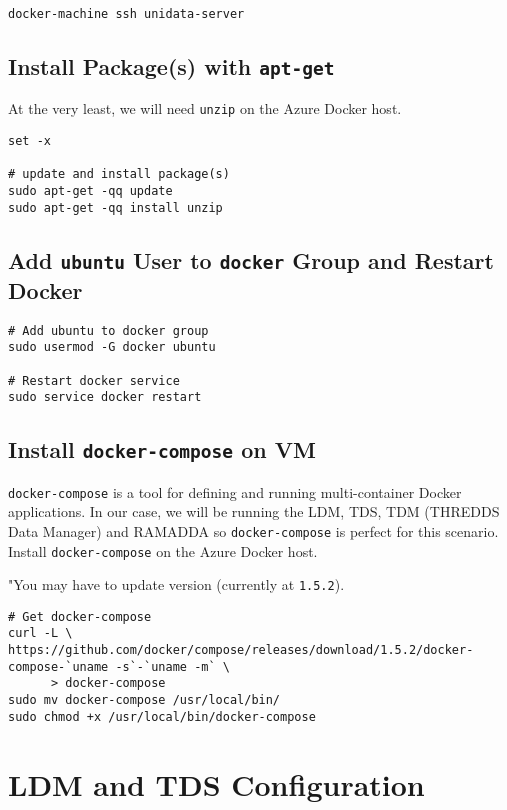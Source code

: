 \documentclass[11pt]{article}
\begin{document}
\begin{verbatim}
docker-machine ssh unidata-server
\end{verbatim}


\subsection{Install Package(s) with \texttt{apt-get}}
\label{sec:orgheadline8}

At the very least, we will need \texttt{unzip} on the Azure Docker host.

\begin{verbatim}
set -x 

# update and install package(s)
sudo apt-get -qq update
sudo apt-get -qq install unzip
\end{verbatim}

\subsection{Add \texttt{ubuntu} User to \texttt{docker} Group and Restart Docker}
\label{sec:orgheadline9}

\begin{verbatim}
# Add ubuntu to docker group
sudo usermod -G docker ubuntu

# Restart docker service
sudo service docker restart
\end{verbatim}

\subsection{Install \texttt{docker-compose} on VM}
\label{sec:orgheadline10}

\texttt{docker-compose} is a tool for defining and running multi-container Docker applications. In our case, we will be running the LDM, TDS, TDM (THREDDS Data Manager) and RAMADDA so \texttt{docker-compose} is perfect for this scenario. Install \texttt{docker-compose} on the Azure Docker host.

"You may have to update version (currently at \texttt{1.5.2}).

\begin{verbatim}
# Get docker-compose
curl -L \
https://github.com/docker/compose/releases/download/1.5.2/docker-compose-`uname -s`-`uname -m` \
      > docker-compose
sudo mv docker-compose /usr/local/bin/
sudo chmod +x /usr/local/bin/docker-compose
\end{verbatim}

\section{LDM and TDS Configuration}
\label{sec:orgheadline27}
\end{document}
